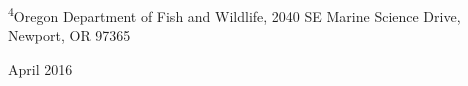 \begin{center}
\vspace{.3cm}

\textsuperscript{4}Oregon Department of Fish and Wildlife, 2040 SE Marine Science Drive, Newport, OR 97365\\


\vspace{.5cm}

\vfill

\vspace{.2cm}
{\large April 2016}

\maketitle

\setcounter{page}{1}
\end{center}


